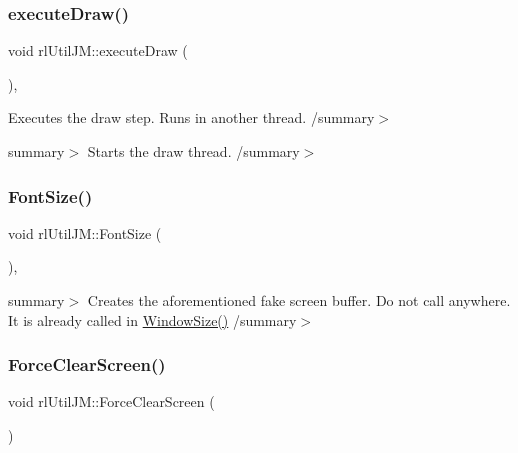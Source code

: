 \mbox{\label{classrl_util_j_m_ad9dc4f7945ef3b7619b792b8d82f3580}} 
\subsubsection{\texorpdfstring{execute\+Draw()}{executeDraw()}}
{\footnotesize\ttfamily void rl\+Util\+J\+M\+::execute\+Draw (\begin{DoxyParamCaption}{ }\end{DoxyParamCaption})\hspace{0.3cm}{\ttfamily [static]}, {\ttfamily [protected]}}



Executes the draw step. Runs in another thread. /summary$>$ 

summary$>$ Starts the draw thread. /summary$>$ \mbox{\label{classrl_util_j_m_a22d403c1bad6a4b6eb74bba4f200496d}} 
\subsubsection{\texorpdfstring{Font\+Size()}{FontSize()}}
{\footnotesize\ttfamily void rl\+Util\+J\+M\+::\+Font\+Size (\begin{DoxyParamCaption}{ }\end{DoxyParamCaption})\hspace{0.3cm}{\ttfamily [static]}, {\ttfamily [private]}}

summary$>$ Creates the aforementioned fake screen buffer. Do not call anywhere. It is already called in {\ttfamily \hyperlink{classrl_util_j_m_a6816ea9d8b393b20bbac3b2712d20654}{Window\+Size()}} /summary$>$ \mbox{\label{classrl_util_j_m_a930b84b615e254f3cb2e83d70c346e94}} 
\subsubsection{\texorpdfstring{Force\+Clear\+Screen()}{ForceClearScreen()}}
{\footnotesize\ttfamily void rl\+Util\+J\+M\+::\+Force\+Clear\+Screen (\begin{DoxyParamCaption}{ }\end{DoxyParamCaption})\hspace{0.3cm}{\ttfamily [static]}}


